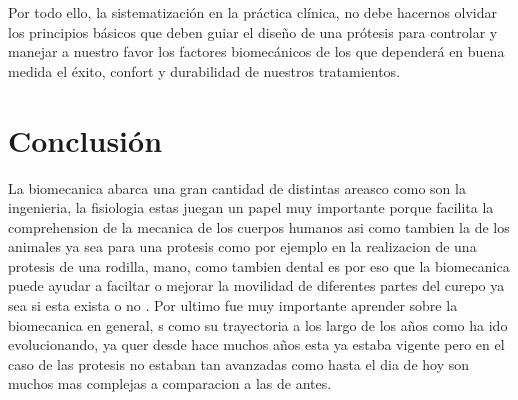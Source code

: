 \documentclass{article}
\begin{document}
Por todo ello, la sistematización en la práctica clínica, no debe hacernos olvidar los principios básicos que deben guiar el diseño de una prótesis para controlar y manejar a nuestro favor los factores biomecánicos de los que dependerá en buena medida el éxito, confort y durabilidad de nuestros tratamientos.

\section{Conclusión}
La biomecanica  abarca una gran cantidad de  distintas areasco   como son la ingenieria, la fisiologia estas juegan un papel muy importante porque facilita la comprehension de la mecanica de los cuerpos humanos asi como  tambien la de los animales ya sea para  una protesis como por ejemplo en la realizacion de una protesis de una rodilla, mano, como tambien dental es por eso   que la biomecanica puede ayudar a faciltar o mejorar la movilidad de  diferentes partes del curepo ya sea si esta exista o no .
Por ultimo  fue muy importante aprender sobre la biomecanica en general, s como su trayectoria a los largo de los años como ha ido evolucionando, ya quer desde hace muchos años esta ya estaba vigente pero en el caso de las protesis no estaban tan avanzadas como hasta el dia de hoy son muchos mas complejas a comparacion a las de antes.
\end{document}
